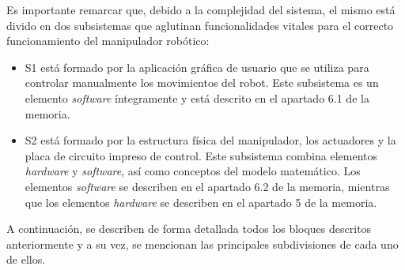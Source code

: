 Es importante remarcar que, debido a la complejidad del sistema, el mismo está divido en dos subsistemas que aglutinan funcionalidades vitales para el correcto funcionamiento del manipulador robótico:

\begin{itemize}
    \item \ac{S1} está formado por la aplicación gráfica de usuario que se utiliza para controlar manualmente los movimientos del robot. Este subsistema es un elemento \textit{software} íntegramente y está descrito en el apartado 6.1 de la memoria.
    
    \item \ac{S2} está formado por la estructura física del manipulador, los actuadores y la placa de circuito impreso de control. Este subsistema combina elementos \textit{hardware} y \textit{software}, así como conceptos del modelo matemático. Los elementos \textit{software} se describen en el apartado 6.2 de la memoria, mientras que los elementos \textit{hardware} se describen en el apartado 5 de la memoria.
\end{itemize}

A continuación, se describen de forma detallada todos los bloques descritos anteriormente y a su vez, se mencionan las principales subdivisiones de cada uno de ellos.\\
